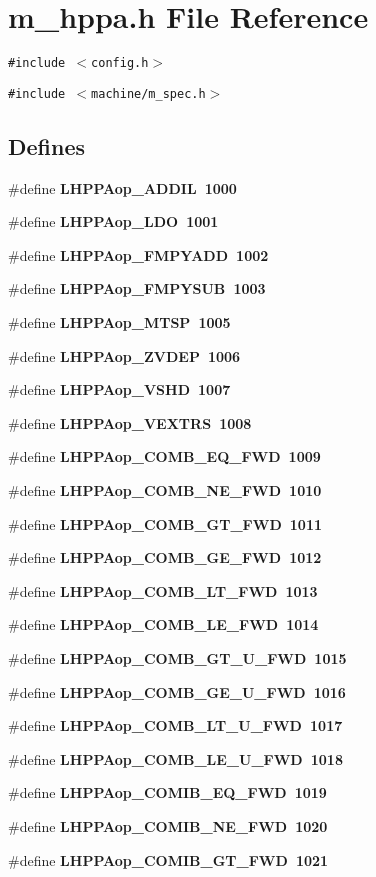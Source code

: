 \section{m\_\-hppa.h File Reference}
\label{m__hppa_8h}
{\tt \#include $<$config.h$>$}\par
{\tt \#include $<$machine/m\_\-spec.h$>$}\par
\subsection*{Defines}
\begin{CompactItemize}
\item 
\#define \bf{LHPPAop\_\-ADDIL}~1000
\item 
\#define \bf{LHPPAop\_\-LDO}~1001
\item 
\#define \bf{LHPPAop\_\-FMPYADD}~1002
\item 
\#define \bf{LHPPAop\_\-FMPYSUB}~1003
\item 
\#define \bf{LHPPAop\_\-MTSP}~1005
\item 
\#define \bf{LHPPAop\_\-ZVDEP}~1006
\item 
\#define \bf{LHPPAop\_\-VSHD}~1007
\item 
\#define \bf{LHPPAop\_\-VEXTRS}~1008
\item 
\#define \bf{LHPPAop\_\-COMB\_\-EQ\_\-FWD}~1009
\item 
\#define \bf{LHPPAop\_\-COMB\_\-NE\_\-FWD}~1010
\item 
\#define \bf{LHPPAop\_\-COMB\_\-GT\_\-FWD}~1011
\item 
\#define \bf{LHPPAop\_\-COMB\_\-GE\_\-FWD}~1012
\item 
\#define \bf{LHPPAop\_\-COMB\_\-LT\_\-FWD}~1013
\item 
\#define \bf{LHPPAop\_\-COMB\_\-LE\_\-FWD}~1014
\item 
\#define \bf{LHPPAop\_\-COMB\_\-GT\_\-U\_\-FWD}~1015
\item 
\#define \bf{LHPPAop\_\-COMB\_\-GE\_\-U\_\-FWD}~1016
\item 
\#define \bf{LHPPAop\_\-COMB\_\-LT\_\-U\_\-FWD}~1017
\item 
\#define \bf{LHPPAop\_\-COMB\_\-LE\_\-U\_\-FWD}~1018
\item 
\#define \bf{LHPPAop\_\-COMIB\_\-EQ\_\-FWD}~1019
\item 
\#define \bf{LHPPAop\_\-COMIB\_\-NE\_\-FWD}~1020
\item 
\#define \bf{LHPPAop\_\-COMIB\_\-GT\_\-FWD}~1021
\item 

\end{CompactItemize}
